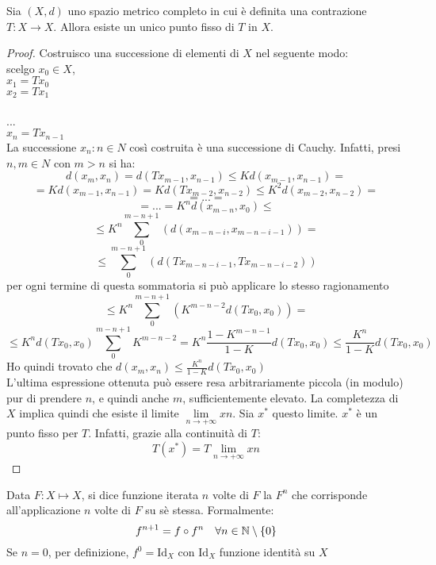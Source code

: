 \begin{theorem}
	\label{teo:contrazioni}
	Sia $(X, d)$ uno spazio metrico completo in cui è definita una contrazione
	$T: X \rightarrow X$. Allora esiste un unico punto fisso di $T$ in $X$.
	\begin{proof}
		Costruisco una successione di elementi di $X$ nel seguente modo:\\
		scelgo $x_0\in X$,\\
		$x_1 = Tx_0$\\
		$x_2 = Tx_1$\\\\
		...\\
		$x_n = Tx_{n-1}$\\
		La successione ${x_n: n \in N }$ così costruita è una successione di Cauchy. Infatti, presi $n, m \in N$ con $m > n$ si ha:
		$$d(x_{m},x_{n}) = d(Tx_{m-1},x_{n-1}) \le Kd(x_{m-1},x_{n-1})=$$
		$$=Kd(x_{m-1},x_{n-1}) = Kd(Tx_{m-2},x_{n-2}) \le K^2d(x_{m-2},x_{n-2})=$$
		$$=...=$$
		$$=...=K^nd(x_{m-n},x_{0})\le$$
		$$\le K^{n}\sum\limits_0^{m-n+1}(d(x_{m-n-i},x_{m-n-i-1}))=$$
		$$\le \sum\limits_0^{m-n+1}(d(Tx_{m-n-i-1},Tx_{m-n-i-2}))$$
		per ogni termine di questa sommatoria si può applicare lo stesso ragionamento
		$$\le K^{n}\sum\limits_0^{m-n+1}(K^{m-n-2}d(Tx_{0},x_{0}))=$$
		$$\le K^{n}d(Tx_{0},x_{0})\sum\limits_0^{m-n+1}K^{m-n-2}=K^n\frac{1-K^{m-n-1}}{1-K}d(Tx_{0},x_{0}) \le \frac{K^n}{1-K}d(Tx_{0},x_{0})$$
		Ho quindi trovato che $d(x_{m},x_{n})\le\frac{K^n}{1-K}d(Tx_{0},x_{0})$\\
		L’ultima espressione ottenuta può essere resa arbitrariamente piccola (in modulo) pur di
		prendere $n$, e quindi anche $m$, sufficientemente elevato. La completezza di $X$ implica quindi
		che esiste il limite $\lim\limits_{n\rightarrow +\infty}xn$. Sia $x^*$ questo limite. $x^*$ è un punto fisso per $T$. Infatti, grazie
		alla continuità di $T$:
		$$T(x^*)=T{\lim\limits_{n\rightarrow +\infty}xn}$$
	\end{proof}
\end{theorem}

\begin{definition}
	\label{def:iterata}
	Data $F:X\mapsto X$, si dice funzione iterata $n$ volte di $F$ la $F^n$ che corrisponde all'applicazione $n$ volte di $F$ su sè stessa. Formalmente:
	$$f^{n+1} = f \circ f^n \quad \forall n \in \mathbb{N}\setminus\left\{0\right\}$$
	Se $n = 0$, per definizione, $f^0 = \mathrm{Id}_X$ con $\mathrm{Id}_X$ funzione identità su $X$
\end{definition}

